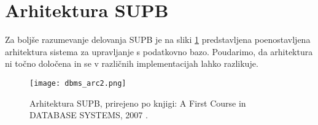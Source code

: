 \documentclass[a4paper,12pt,openright]{book}
\begin{document}
    \section{Arhitektura SUPB}

    Za boljše razumevanje delovanja SUPB je na sliki \ref{sl:dbms_architecture} predstavljena poenostavljena arhitektura sistema za upravljanje s podatkovno bazo. Poudarimo, da arhitektura ni točno določena in se v različnih implementacijah lahko razlikuje.

    \newpage
    \begin{figure}[t]
        \centerline{\texttt{[image: dbms\_arc2.png]}}
        \caption{Arhitektura SUPB, prirejeno po knjigi: A First Course in DATABASE SYSTEMS, 2007 \cite{ullman2007first}.}
        \label{sl:dbms_architecture}
    \end{figure}
\end{document}
